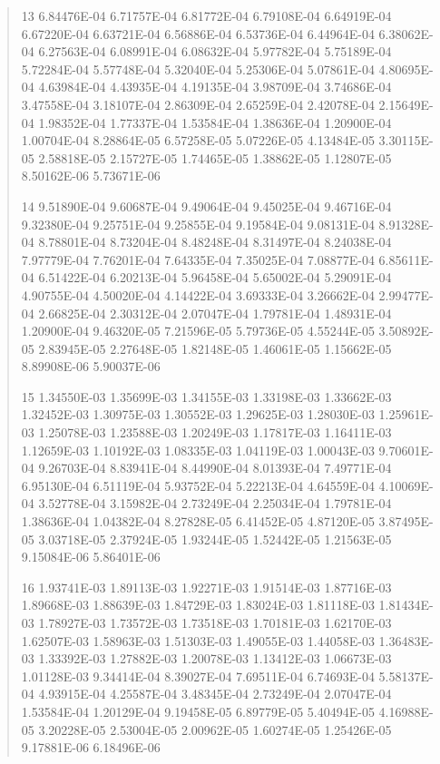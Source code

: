 \documentclass[letterpaper,10pt,english]{sphinxmanual}
\begin{document}
\begin{quote}
\begin{DUlineblock}{0em}
\item[] 13   6.84476E-04  6.71757E-04  6.81772E-04  6.79108E-04  6.64919E-04  6.67220E-04  6.63721E-04  6.56886E-04  6.53736E-04  6.44964E-04  6.38062E-04  6.27563E-04  6.08991E-04  6.08632E-04  5.97782E-04  5.75189E-04  5.72284E-04  5.57748E-04  5.32040E-04  5.25306E-04  5.07861E-04  4.80695E-04  4.63984E-04  4.43935E-04  4.19135E-04  3.98709E-04  3.74686E-04  3.47558E-04  3.18107E-04  2.86309E-04  2.65259E-04  2.42078E-04  2.15649E-04  1.98352E-04  1.77337E-04  1.53584E-04  1.38636E-04  1.20900E-04  1.00704E-04  8.28864E-05  6.57258E-05  5.07226E-05  4.13484E-05  3.30115E-05  2.58818E-05  2.15727E-05  1.74465E-05  1.38862E-05  1.12807E-05  8.50162E-06  5.73671E-06
\item[] 14   9.51890E-04  9.60687E-04  9.49064E-04  9.45025E-04  9.46716E-04  9.32380E-04  9.25751E-04  9.25855E-04  9.19584E-04  9.08131E-04  8.91328E-04  8.78801E-04  8.73204E-04  8.48248E-04  8.31497E-04  8.24038E-04  7.97779E-04  7.76201E-04  7.64335E-04  7.35025E-04  7.08877E-04  6.85611E-04  6.51422E-04  6.20213E-04  5.96458E-04  5.65002E-04  5.29091E-04  4.90755E-04  4.50020E-04  4.14422E-04  3.69333E-04  3.26662E-04  2.99477E-04  2.66825E-04  2.30312E-04  2.07047E-04  1.79781E-04  1.48931E-04  1.20900E-04  9.46320E-05  7.21596E-05  5.79736E-05  4.55244E-05  3.50892E-05  2.83945E-05  2.27648E-05  1.82148E-05  1.46061E-05  1.15662E-05  8.89908E-06  5.90037E-06
\item[] 15   1.34550E-03  1.35699E-03  1.34155E-03  1.33198E-03  1.33662E-03  1.32452E-03  1.30975E-03  1.30552E-03  1.29625E-03  1.28030E-03  1.25961E-03  1.25078E-03  1.23588E-03  1.20249E-03  1.17817E-03  1.16411E-03  1.12659E-03  1.10192E-03  1.08335E-03  1.04119E-03  1.00043E-03  9.70601E-04  9.26703E-04  8.83941E-04  8.44990E-04  8.01393E-04  7.49771E-04  6.95130E-04  6.51119E-04  5.93752E-04  5.22213E-04  4.64559E-04  4.10069E-04  3.52778E-04  3.15982E-04  2.73249E-04  2.25034E-04  1.79781E-04  1.38636E-04  1.04382E-04  8.27828E-05  6.41452E-05  4.87120E-05  3.87495E-05  3.03718E-05  2.37924E-05  1.93244E-05  1.52442E-05  1.21563E-05  9.15084E-06  5.86401E-06
\item[] 16   1.93741E-03  1.89113E-03  1.92271E-03  1.91514E-03  1.87716E-03  1.89668E-03  1.88639E-03  1.84729E-03  1.83024E-03  1.81118E-03  1.81434E-03  1.78927E-03  1.73572E-03  1.73518E-03  1.70181E-03  1.62170E-03  1.62507E-03  1.58963E-03  1.51303E-03  1.49055E-03  1.44058E-03  1.36483E-03  1.33392E-03  1.27882E-03  1.20078E-03  1.13412E-03  1.06673E-03  1.01128E-03  9.34414E-04  8.39027E-04  7.69511E-04  6.74693E-04  5.58137E-04  4.93915E-04  4.25587E-04  3.48345E-04  2.73249E-04  2.07047E-04  1.53584E-04  1.20129E-04  9.19458E-05  6.89779E-05  5.40494E-05  4.16988E-05  3.20228E-05  2.53004E-05  2.00962E-05  1.60274E-05  1.25426E-05  9.17881E-06  6.18496E-06

\end{DUlineblock}
\end{quote}
\end{document}

